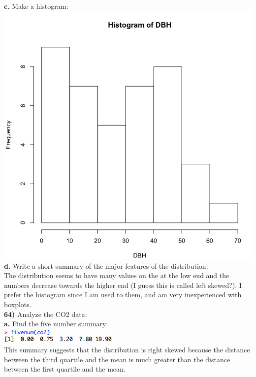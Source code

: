 \documentclass{scrartcl}
\begin{document}
\textbf{c.} Make a histogram:\\
\includegraphics[keepaspectratio=true, scale=0.2]{ch1_56_histogram.png}\\

\textbf{d.} Write a short summary of the major features of the distribution:\\

The distribution seems to have many values on the at the low end and the numbers decrease towards the higher end (I guess this is called left skewed?). I prefer the histogram since I am used to them, and am very inexperienced with boxplots.\\

\textbf{64)} Analyze the CO2 data:\\

\textbf{a.} Find the five number summary:\\
\includegraphics[keepaspectratio=true, scale=0.75]{ch1_64_fivenum.png}\\
This summary suggests that the distribution is right skewed because the distance between the third quartile and the mean is much greater than the distance between the first quartile and the mean.\\
\end{document}
